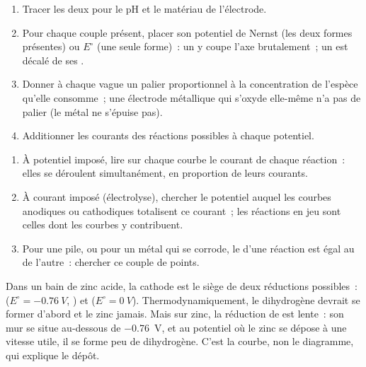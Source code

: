 \begin{method}\label{met:b2:current-potential-curves:sketch-ie}
\begin{enumerate}
  \item Tracer les deux  pour le pH et le matériau de
        l'électrode.
  \item Pour chaque couple présent, placer son potentiel de Nernst (les deux formes
        présentes) ou $E^\circ$ (une seule forme)~: un  y coupe l'axe
        brutalement~; un  est décalé de ses .
  \item Donner à chaque vague un palier proportionnel à la concentration de
        l'espèce qu'elle consomme~; une électrode métallique qui s'oxyde elle-même n'a pas de
        palier (le métal ne s'épuise pas).
  \item Additionner les courants des réactions possibles à chaque potentiel.
\end{enumerate}
\end{method}

\begin{method}\label{met:b2:current-potential-curves:read-ie}
\begin{enumerate}
  \item À potentiel imposé, lire sur chaque courbe le courant de chaque
        réaction~: elles se déroulent simultanément, en proportion de leurs courants.
  \item À courant imposé (électrolyse), chercher le potentiel auquel les courbes
        anodiques ou cathodiques totalisent ce courant~; les réactions en jeu
        sont celles dont les courbes y contribuent.
  \item Pour une pile, ou pour un métal qui se corrode, le  d'une réaction
        est égal au  de l'autre~: chercher ce couple de
        points.
\end{enumerate}
\end{method}

\begin{example}\label{ex:b2:current-potential-curves:zinc}
Dans un bain de zinc acide, la cathode est le siège de deux réductions possibles~:  ($E^\circ = \qty{-0.76}{V}$, ) et 
($E^\circ = \qty{0}{V}$). Thermodynamiquement, le dihydrogène devrait se former d'abord et le zinc
jamais. Mais sur zinc, la réduction de  est lente~: son mur se situe au-dessous de
\qty{-0.76}{V}, et au potentiel où le zinc se dépose à une vitesse utile,
il se forme peu de dihydrogène. C'est la courbe, non le diagramme, qui explique le
dépôt.
\end{example}


